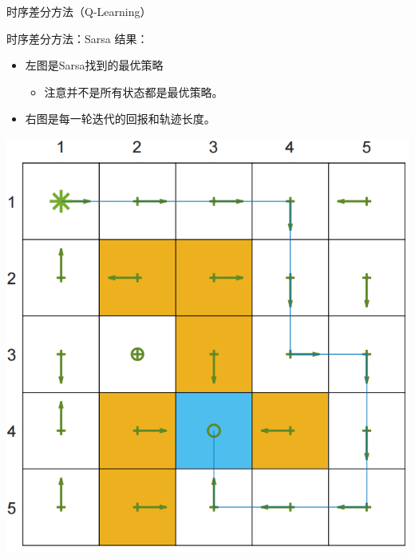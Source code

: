 \begin{section}{时序差分方法\alert{（Q-Learning）}}
\begin{frame}{时序差分方法：Sarsa}
    结果：
    \begin{itemize}
        \item 左图是Sarsa找到的最优策略
        \begin{itemize}
            \item \alert{注意并不是所有状态都是最优策略。}
        \end{itemize}
        \item 右图是每一轮迭代的回报和轨迹长度。
    \end{itemize}
    \begin{center}
        \begin{minipage}{0.35\textwidth}
            \centering
            \includegraphics[width=\linewidth]{assets/SarsaPolicy.jpg}
        \end{minipage}
        \hspace{1cm}
        \begin{minipage}{0.35\textwidth}
            \centering

\end{minipage}
\end{center}
\end{frame}
\end{section}
